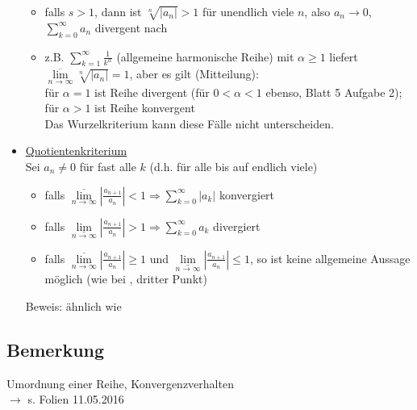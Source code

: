 \documentclass[12pt, titlepage]{article}
\newcommand{\infn}{n\rightarrow\infty}
\renewcommand{\*}{\cdot}
\renewcommand{\limsup}[1]{\underset{#1}{\overline{\lim}}}
\renewcommand{\liminf}[1]{\underset{#1}{\underline{\lim}}}
\begin{document}
\begin{itemize}
\begin{itemize}
		\item falls $s>1$, dann ist $\sqrt[n]{|a_n|}>1$ für unendlich viele $n$, also $a_n\rightarrow0$, $\sum_{k=0}^{\infty}a_n$ divergent nach 
		\item z.B. $\sum_{k=1}^{\infty}\frac{1}{k^\alpha}$ (allgemeine harmonische Reihe) mit $\alpha\geq1$ liefert $\limsup{\infn}\sqrt[n]{|a_n|}=1$, aber es gilt (Mitteilung):\\
		für $\alpha=1$ ist Reihe divergent (für $0<\alpha<1$ ebenso, Blatt 5 Aufgabe 2);\\
		für $\alpha>1$ ist Reihe konvergent\\
		Das Wurzelkriterium kann diese Fälle nicht unterscheiden.
	\end{itemize}
	\item[\fbox{6b}] \underline{Quotientenkriterium}\\
	Sei $a_n\neq0$ für fast alle $k$ (d.h. für alle bis auf endlich viele)
	\begin{itemize}
		\item falls $\limsup{\infn}|\frac{a_{n+1}}{a_n}|<1\Rightarrow\sum_{k=0}^{\infty}|a_k|$ konvergiert
		\item falls $\liminf{\infn}|\frac{a_{n+1}}{a_n}|>1\Rightarrow\sum_{k=0}^{\infty}a_k$ divergiert
		\item falls $\limsup{\infn}|\frac{a_{n+1}}{a_n}|\geq1$ und $\liminf{\infn}|\frac{a_{n+1}}{a_n}|\leq1$, so ist keine allgemeine Aussage möglich (wie bei , dritter Punkt)
	\end{itemize}
	Beweis: ähnlich wie 
 \end{itemize}%
 \subsection{Bemerkung}
 Umordnung einer Reihe, Konvergenzverhalten\\
 $\rightarrow$ s. Folien 11.05.2016
	
	
	
	
	
	
	
	
	
	
	
	
	
	
	
\end{document}
